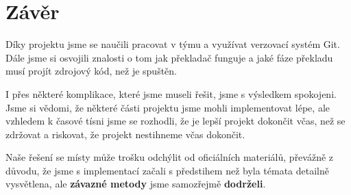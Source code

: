 \documentclass[a4paper, 11pt]{article}
\begin{document}
	\section{Závěr}
	Díky projektu jsme se naučili pracovat v týmu a využívat verzovací systém Git. Dále jsme si osvojili znalosti o tom jak překladač funguje a jaké fáze překladu musí projít zdrojový kód, než je spuštěn.
	\par\noindent I přes některé komplikace, které jsme museli řešit, jsme s výsledkem spokojeni. Jsme si vědomi, že některé části projektu jsme mohli implementovat lépe, ale vzhledem k časové tísni jsme se rozhodli, že je lepší projekt dokončit včas, než se zdržovat a riskovat, že projekt nestihneme včas dokončit.
	\par\noindent Naše řešení se místy může trošku odchýlit od oficiálních materiálů, převážně z důvodu, že jsme s implementací začali s předstihem než byla témata detailně vysvětlena, ale \textbf{závazné metody} jsme samozřejmě \textbf{dodrželi}.
	




	\newpage
\end{document}
